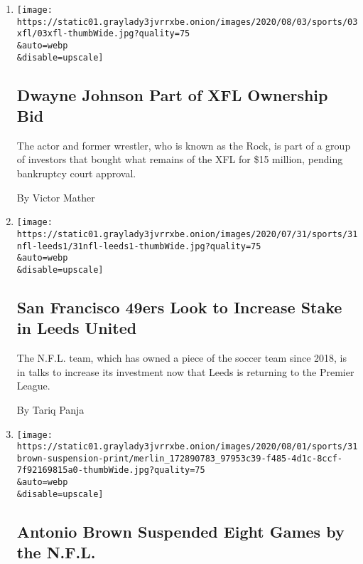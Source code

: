 \begin{enumerate}
\def\labelenumi{\arabic{enumi}.}
\item
  \href{/2020/08/03/sports/football/xfl-the-rock-dwayne-johnson.html}{}

  \texttt{[image: https://static01.graylady3jvrrxbe.onion/images/2020/08/03/sports/03xfl/03xfl-thumbWide.jpg?quality=75\\\&auto=webp\\\&disable=upscale]}

  \hypertarget{dwayne-johnson-part-of-xfl-ownership-bid}{%
  \subsection{Dwayne Johnson Part of XFL Ownership
  Bid}\label{dwayne-johnson-part-of-xfl-ownership-bid}}

  The actor and former wrestler, who is known as the Rock, is part of a
  group of investors that bought what remains of the XFL for \$15
  million, pending bankruptcy court approval.

  By Victor Mather
\item
  \href{/2020/07/31/sports/soccer/leeds-united-san-francisco-49ers.html}{}

  \texttt{[image: https://static01.graylady3jvrrxbe.onion/images/2020/07/31/sports/31nfl-leeds1/31nfl-leeds1-thumbWide.jpg?quality=75\\\&auto=webp\\\&disable=upscale]}

  \hypertarget{san-francisco-49ers-look-to-increase-stake-in-leeds-united}{%
  \subsection{San Francisco 49ers Look to Increase Stake in Leeds
  United}\label{san-francisco-49ers-look-to-increase-stake-in-leeds-united}}

  The N.F.L. team, which has owned a piece of the soccer team since
  2018, is in talks to increase its investment now that Leeds is
  returning to the Premier League.

  By Tariq Panja
\item
  \href{/2020/07/31/sports/football/antonio-brown-suspension-nfl.html}{}

  \texttt{[image: https://static01.graylady3jvrrxbe.onion/images/2020/08/01/sports/31brown-suspension-print/merlin\_172890783\_97953c39-f485-4d1c-8ccf-7f92169815a0-thumbWide.jpg?quality=75\\\&auto=webp\\\&disable=upscale]}

  \hypertarget{antonio-brown-suspended-eight-games-by-the-nfl}{%
  \subsection{Antonio Brown Suspended Eight Games by the
  N.F.L.}\label{antonio-brown-suspended-eight-games-by-the-nfl}}


\end{enumerate}
